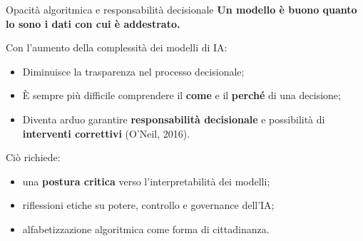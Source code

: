 \documentclass{beamer}
\begin{document}
%
%
\begin{frame}{Opacità algoritmica e responsabilità decisionale}
\small
\textbf{Un modello è buono quanto lo sono i dati con cui è addestrato.}

\vspace{0.3cm}
Con l’aumento della complessità dei modelli di IA:
\begin{itemize}
    \item Diminuisce la trasparenza nel processo decisionale;
    \item È sempre più difficile comprendere il \textbf{come} e il \textbf{perché} di una decisione;
    \item Diventa arduo garantire \textbf{responsabilità decisionale} e possibilità di \textbf{interventi correttivi} (O’Neil, 2016).
\end{itemize}

\vspace{0.3cm}
Ciò richiede:
\begin{itemize}
    \item una \textbf{postura critica} verso l’interpretabilità dei modelli;
    \item riflessioni etiche su potere, controllo e governance dell’IA;
    \item alfabetizzazione algoritmica come forma di cittadinanza.
\end{itemize}
\end{frame}
%
\end{document}
